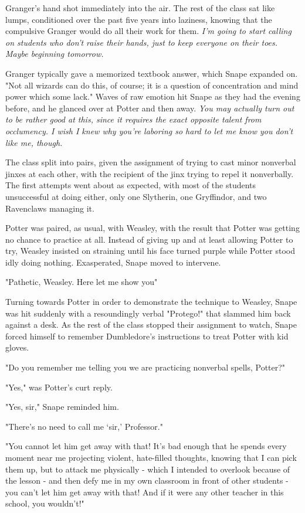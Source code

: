 Granger's hand shot immediately into the air. The rest of the class sat like lumps, conditioned over the past five years into laziness, knowing that the compulsive Granger would do all their work for them. \emph{I'm going to start calling on students who don't raise their hands, just to keep everyone on their toes. Maybe beginning tomorrow.}

Granger typically gave a memorized textbook answer, which Snape expanded on. "Not all wizards can do this, of course; it is a question of concentration and mind power which some lack." Waves of raw emotion hit Snape as they had the evening before, and he glanced over at Potter and then away. \emph{You may actually turn out to be rather good at this, since it requires the exact opposite talent from occlumency. I wish I knew why you're laboring so hard to let me know you don't like me, though.}

The class split into pairs, given the assignment of trying to cast minor nonverbal jinxes at each other, with the recipient of the jinx trying to repel it nonverbally. The first attempts went about as expected, with most of the students unsuccessful at doing either, only one Slytherin, one Gryffindor, and two Ravenclaws managing it.

Potter was paired, as usual, with Weasley, with the result that Potter was getting no chance to practice at all. Instead of giving up and at least allowing Potter to try, Weasley insisted on straining until his face turned purple while Potter stood idly doing nothing. Exasperated, Snape moved to intervene.

"Pathetic, Weasley. Here{\el} let me show you{\el}"

Turning towards Potter in order to demonstrate the technique to Weasley, Snape was hit suddenly with a resoundingly verbal "Protego!" that slammed him back against a desk. As the rest of the class stopped their assignment to watch, Snape forced himself to remember Dumbledore's instructions to treat Potter with kid gloves.

"Do you remember me telling you we are practicing nonverbal spells, Potter?"

"Yes," was Potter's curt reply.

"Yes, sir," Snape reminded him.

"There's no need to call me `sir,' Professor."

\sbreak

"You cannot let him get away with that! It's bad enough that he spends every moment near me projecting violent, hate-filled thoughts, knowing that I can pick them up, but to attack me physically - which I intended to overlook because of the lesson - and then defy me in my own classroom in front of other students - you can't let him get away with that! And if it were any other teacher in this school, you wouldn't!"

